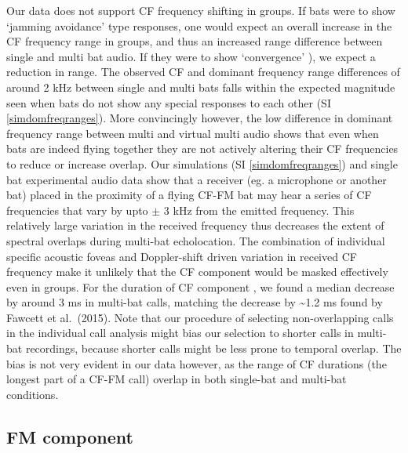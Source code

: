 \documentclass[
]{book}
\begin{document}
Our data does not support CF frequency shifting in groups. If bats were to show `jamming avoidance' type responses, one would expect an overall increase in the CF frequency range in groups, and thus an increased range difference between single and multi bat audio. If they were to show `convergence' ), we expect a reduction in range. The observed CF and dominant frequency range differences of around 2 kHz between single and multi bats falls within the expected magnitude seen when bats do not show any special responses to each other (SI \ref{simdomfreqranges}). More convincingly however, the low difference in dominant frequency range between multi and virtual multi audio shows that even when bats are indeed flying together they are not actively altering their CF frequencies to reduce or increase overlap. Our simulations (SI \ref{simdomfreqranges}) and single bat experimental audio data show that a receiver (eg. a microphone or another bat) placed in the proximity of a flying CF-FM bat may hear a series of CF frequencies that vary by upto \(\pm\) 3 kHz from the emitted frequency. This relatively large variation in the received frequency thus decreases the extent of spectral overlaps during multi-bat echolocation. The combination of individual specific acoustic foveas and Doppler-shift driven variation in received CF frequency make it unlikely that the CF component would be masked effectively even in groups. For the duration of CF component , we found a median decrease by around 3 ms in multi-bat calls, matching the decrease by \textasciitilde1.2 ms found by Fawcett et al.~(2015). Note that our procedure of selecting non-overlapping calls in the individual call analysis might bias our selection to shorter calls in multi-bat recordings, because shorter calls might be less prone to temporal overlap. The bias is not very evident in our data however, as the range of CF durations (the longest part of a CF-FM call) overlap in both single-bat and multi-bat conditions.

\hypertarget{fm-component}{%
\subsection{FM component}\label{fm-component}}
\end{document}
